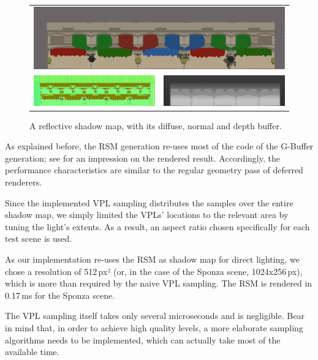 \begin{figure}[htb]
\centering
  \begin{tabular}{@{}cc@{}}
    \multicolumn{2}{c}{\includegraphics[width=1.0\textwidth]{screenshots/RSM_diffuse}} \\
    \includegraphics[width=.48\textwidth]{screenshots/RSM_normal} &
    \includegraphics[width=.48\textwidth]{screenshots/RSM_depth}
  \end{tabular}
  \caption{A reflective shadow map, with its diffuse, normal and depth buffer.}
  \label{fig:results:RSMBuffers}
\end{figure}


As explained before, the RSM generation re-uses most of the code of the G-Buffer generation; see  for an impression on the rendered result. Accordingly, the performance characteristics are similar to the regular geometry pass of deferred renderers.

Since the implemented VPL sampling distributes the samples over the entire shadow map, we simply limited the VPLs' locations to the relevant area by tuning the light's extents. As a result, an aspect ratio chosen specifically for each test scene is used.

As our implementation re-uses the RSM as shadow map for direct lighting, we chose a resolution of 512\,px² (or, in the case of the Sponza scene, 1024x256\,px), which is more than required by the naive VPL sampling. The RSM is rendered in 0.17\,ms for the Sponza scene.

The VPL sampling itself takes only several microseconds and is negligible. Bear in mind that, in order to achieve high quality levels, a more elaborate sampling algorithms needs to be implemented, which can actually take most of the available time.


